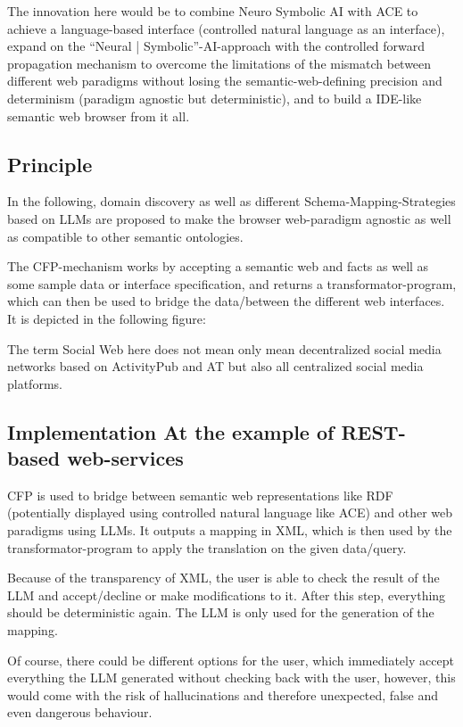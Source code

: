 \documentclass[12pt,a4paper]{article}
\begin{document}
The innovation here would be to combine Neuro Symbolic AI with ACE to achieve a language-based interface (controlled natural language as an interface), expand on the ``Neural | Symbolic''-AI-approach with the controlled forward propagation mechanism to overcome the limitations of the mismatch between different web paradigms without losing the semantic-web-defining precision and determinism (paradigm agnostic but deterministic), and to build a IDE-like semantic web browser from it all.

\subsection{Principle}

In the following, domain discovery as well as different Schema-Mapping-Strategies based on LLMs are proposed to make the browser web-paradigm agnostic as well as compatible to other semantic ontologies.

The CFP-mechanism works by accepting a semantic web and facts as well as some sample data or interface specification, and returns a transformator-program, which can then be used to bridge the data/between the different web interfaces. It is depicted in the following figure:

The term Social Web here does not mean only mean decentralized social media networks based on ActivityPub and AT but also all centralized social media platforms.

\subsection{Implementation At the example of REST-based web-services}

CFP is used to bridge between semantic web representations like RDF (potentially displayed using controlled natural language like ACE) and other web paradigms using LLMs. It outputs a mapping in XML, which is then used by the transformator-program to apply the translation on the given data/query.

Because of the transparency of XML, the user is able to check the result of the LLM and accept/decline or make modifications to it. After this step, everything should be deterministic again. The LLM is only used for the generation of the mapping.

Of course, there could be different options for the user, which immediately accept everything the LLM generated without checking back with the user, however, this would come with the risk of hallucinations and therefore unexpected, false and even dangerous behaviour.
\end{document}
